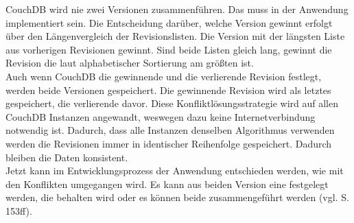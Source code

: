 CouchDB wird nie zwei Versionen zusammenführen. Das muss in der Anwendung implementiert sein.
Die Entscheidung darüber, welche Version gewinnt erfolgt über den Längenvergleich der Revisionslisten. Die Version mit der längsten Liste aus vorherigen Revisionen gewinnt. Sind beide Listen gleich lang, gewinnt die Revision die laut alphabetischer Sortierung am größten ist.\\
Auch wenn CouchDB die gewinnende und die verlierende Revision festlegt, werden beide Versionen gespeichert. Die gewinnende Revision wird als letztes gespeichert, die verlierende davor. Diese Konfliktlösungsstrategie wird auf allen CouchDB Instanzen angewandt, weswegen dazu keine Internetverbindung notwendig ist. Dadurch, dass alle Instanzen denselben Algorithmus verwenden werden die Revisionen immer in identischer Reihenfolge gespeichert. Dadurch bleiben die Daten konsistent.\\
Jetzt kann im Entwicklungsprozess der Anwendung entschieden werden, wie mit den Konflikten umgegangen wird.
Es kann aus beiden Version eine festgelegt werden, die behalten wird oder es können beide zusammengeführt werden (vgl. \cite{couchDB} S. 153ff).
%

%
%
